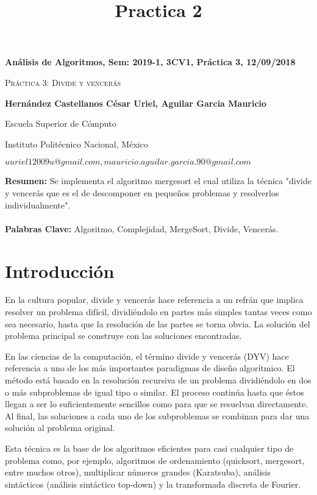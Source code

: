 \documentclass[12pt,twoside]{article}
\title{Practica 2}
\date{}
\begin{document}
\centerline{\bf An\'alisis de Algoritmos, Sem: 2019-1, 3CV1, Pr\'actica 3, 12/09/2018}
\centerline{}
\centerline{}
\begin{center}
\Large{\textsc{Pr\'actica 3: Divide y vencerás}}
\end{center}
\centerline{}
\centerline{\bf {Hern\'andez Castellanos C\'esar Uriel, Aguilar Garcia Mauricio}}
\centerline{}
\centerline{Escuela Superior de C\'omputo}
\centerline{Instituto Polit\'ecnico Nacional, M\'exico}
\centerline{$uuriel12009u@gmail.com, mauricio.aguilar.garcia.90@gmail.com$}
\newtheorem{Theorem}{\quad Theorem}[section]
\newtheorem{Definition}[Theorem]{\quad Definition}
\newtheorem{Corollary}[Theorem]{\quad Corollary}
\newtheorem{Lemma}[Theorem]{\quad Lemma}
\newtheorem{Example}[Theorem]{\quad Example}
\bigskip
\textbf{Resumen: } Se implementa el algoritmo mergesort el cual utiliza la técnica "divide y vencerás que es el de descomponer en pequeños problemas y resolverlos individualmente".
\\ 
\\
\textbf{Palabras Clave: } Algoritmo, Complejidad, MergeSort, Divide, Vencerás.

\section{Introducción}
\label{sec:introduction}

En la cultura popular, divide y vencerás hace referencia a un refrán que implica resolver un problema difícil, dividiéndolo en partes más simples tantas veces como sea necesario, hasta que la resolución de las partes se torna obvia. La solución del problema principal se construye con las soluciones encontradas.

En las ciencias de la computación, el término divide y vencerás (DYV) hace referencia a uno de los más importantes paradigmas de diseño algorítmico. El método está basado en la resolución recursiva de un problema dividiéndolo en dos o más subproblemas de igual tipo o similar. El proceso continúa hasta que éstos llegan a ser lo suficientemente sencillos como para que se resuelvan directamente. Al final, las soluciones a cada uno de los subproblemas se combinan para dar una solución al problema original.

Esta técnica es la base de los algoritmos eficientes para casi cualquier tipo de problema como, por ejemplo, algoritmos de ordenamiento (quicksort, mergesort, entre muchos otros), multiplicar números grandes (Karatsuba), análisis sintácticos (análisis sintáctico top-down) y la transformada discreta de Fourier.
\end{document}
